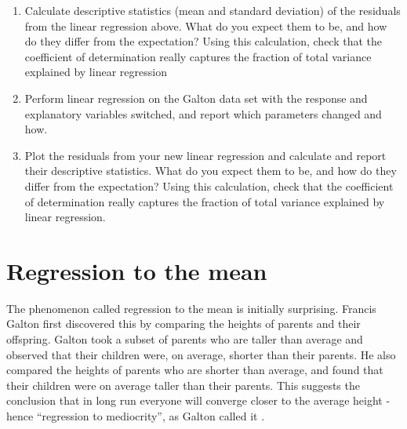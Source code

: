 \documentclass[
]{book}
\theoremstyle{definition}
\theoremstyle{definition}
\theoremstyle{definition}
\theoremstyle{remark}
\begin{document}
\begin{enumerate}
\def\labelenumi{\arabic{enumi}.}
\item
  Calculate descriptive statistics (mean and standard deviation) of the residuals from the linear regression above. What do you expect them to be, and how do they differ from the expectation? Using this calculation, check that the coefficient of determination really captures the fraction of total variance explained by linear regression
\item
  Perform linear regression on the Galton data set with the response and explanatory variables switched, and report which parameters changed and how.
\item
  Plot the residuals from your new linear regression and calculate and report their descriptive statistics. What do you expect them to be, and how do they differ from the expectation? Using this calculation, check that the coefficient of determination really captures the fraction of total variance explained by linear regression.
\end{enumerate}

\hypertarget{regression-to-the-mean}{%
\section{Regression to the mean}\label{regression-to-the-mean}}

\label{sec:bio8}
The phenomenon called  regression to the mean is initially surprising. Francis Galton first discovered this by comparing the heights of parents and their offspring. Galton took a subset of parents who are taller than average and observed that their children were, on average, shorter than their parents. He also compared the heights of parents who are shorter than average, and found that their children were on average taller than their parents. This suggests the conclusion that in long run everyone will converge closer to the average height - hence ``regression to mediocrity'', as Galton called it \citep{senn_francis_2011}.
\end{document}
